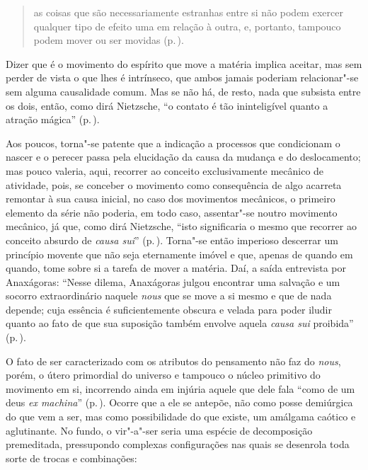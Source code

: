 \begin{quote} 
as coisas que são necessariamente estranhas entre si não
 podem exercer qualquer tipo de efeito uma em relação à outra, e, portanto,
 tampouco podem mover ou ser movidas (p.\,\pageref{coisasquesao}).
\end{quote} 

Dizer que é o movimento do espírito que move a matéria implica aceitar, mas
sem perder de vista o que lhes é intrínseco, que ambos jamais poderiam
relacionar"-se sem alguma causalidade comum. Mas se não há, de resto, nada
que subsista entre os dois, então, como dirá Nietzsche, ``o contato é tão
ininteligível quanto a atração mágica'' (p.\,\pageref{ocontatoe}).

Aos poucos, torna"-se patente que a indicação a processos que condicionam o
nascer e o perecer passa pela elucidação da causa da mudança e do
deslocamento; mas pouco valeria, aqui, recorrer ao conceito exclusivamente
mecânico de atividade, pois, se conceber o movimento como consequência de
algo acarreta remontar à sua causa inicial, no caso dos movimentos mecânicos,
o primeiro elemento da série não poderia, em todo caso, assentar"-se noutro
movimento mecânico, já que, como dirá Nietzsche, ``isto significaria o mesmo
que recorrer ao conceito absurdo de \textit{causa sui}'' (p.\,\pageref{causasui}). 
Torna"-se então imperioso descerrar um princípio movente que não
seja eternamente imóvel e que, apenas de quando em quando, tome sobre si a
tarefa de mover a matéria. Daí, a saída entrevista por Anaxágoras: ``Nesse
dilema, Anaxágoras julgou encontrar uma salvação e um socorro extraordinário
naquele \textit{nous} que se move a si mesmo e que de nada depende; cuja
essência é suficientemente obscura e velada para poder iludir quanto ao fato
de que sua suposição também envolve aquela \textit{causa sui} proibida''
(p.\,\pageref{nessedilema}).

O fato de ser caracterizado com os atributos do pensamento não faz do
\textit{nous}, porém,\textit{ }o útero primordial do universo e tampouco o
 núcleo primitivo do movimento em si, incorrendo ainda em injúria aquele que
 dele fala ``como de um deus \textit{ex machina}'' (p.\,\pageref{exmachina}). 
 Ocorre que a ele se antepõe, não como posse demiúrgica do que
 vem a ser, mas como possibilidade do que existe, um amálgama caótico e
 aglutinante. No fundo, o vir"-a"-ser seria uma espécie de decomposição
 premeditada, pressupondo complexas configurações nas quais se desenrola toda
 sorte de trocas e combinações: 

